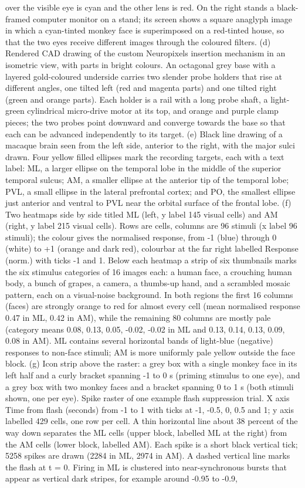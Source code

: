 \documentclass{article}
\begin{document}
over the visible eye is cyan and the other lens is red. On the right stands a black-framed computer monitor on a stand; its screen shows a square anaglyph image in which a cyan-tinted monkey face is superimposed on a red-tinted house, so that the two eyes receive different images through the coloured filters. (d) Rendered CAD drawing of the custom Neuropixels insertion mechanism in an isometric view, with parts in bright colours. An octagonal grey base with a layered gold-coloured underside carries two slender probe holders that rise at different angles, one tilted left (red and magenta parts) and one tilted right (green and orange parts). Each holder is a rail with a long probe shaft, a light-green cylindrical micro-drive motor at its top, and orange and purple clamp pieces; the two probes point downward and converge towards the base so that each can be advanced independently to its target. (e) Black line drawing of a macaque brain seen from the left side, anterior to the right, with the major sulci drawn. Four yellow filled ellipses mark the recording targets, each with a text label: ML, a larger ellipse on the temporal lobe in the middle of the superior temporal sulcus; AM, a smaller ellipse at the anterior tip of the temporal lobe; PVL, a small ellipse in the lateral prefrontal cortex; and PO, the smallest ellipse just anterior and ventral to PVL near the orbital surface of the frontal lobe. (f) Two heatmaps side by side titled ML (left, y label 145 visual cells) and AM (right, y label 215 visual cells). Rows are cells, columns are 96 stimuli (x label 96 stimuli); the colour gives the normalised response, from -1 (blue) through 0 (white) to +1 (orange and dark red), colourbar at the far right labelled Response (norm.) with ticks -1 and 1. Below each heatmap a strip of six thumbnails marks the six stimulus categories of 16 images each: a human face, a crouching human body, a bunch of grapes, a camera, a thumbs-up hand, and a scrambled mosaic pattern, each on a visual-noise background. In both regions the first 16 columns (faces) are strongly orange to red for almost every cell (mean normalised response 0.47 in ML, 0.42 in AM), while the remaining 80 columns are mostly pale (category means 0.08, 0.13, 0.05, -0.02, -0.02 in ML and 0.13, 0.14, 0.13, 0.09, 0.08 in AM). ML contains several horizontal bands of light-blue (negative) responses to non-face stimuli; AM is more uniformly pale yellow outside the face block. (g) Icon strip above the raster: a grey box with a single monkey face in its left half and a curly bracket spanning -1 to 0 s (priming stimulus to one eye), and a grey box with two monkey faces and a bracket spanning 0 to 1 s (both stimuli shown, one per eye). Spike raster of one example flash suppression trial. X axis Time from flash (seconds) from -1 to 1 with ticks at -1, -0.5, 0, 0.5 and 1; y axis labelled 429 cells, one row per cell. A thin horizontal line about 38 percent of the way down separates the ML cells (upper block, labelled ML at the right) from the AM cells (lower block, labelled AM). Each spike is a short black vertical tick; 5258 spikes are drawn (2284 in ML, 2974 in AM). A dashed vertical line marks the flash at t = 0. Firing in ML is clustered into near-synchronous bursts that appear as vertical dark stripes, for example around -0.95 to -0.9, 
\end{document}
